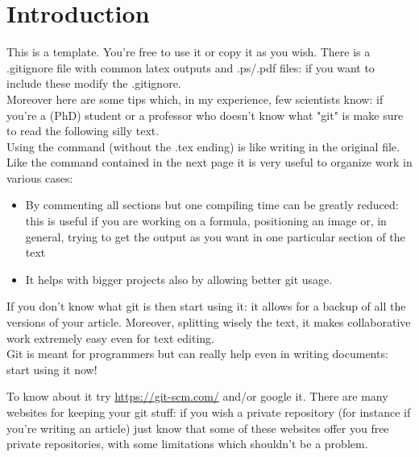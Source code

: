 \section{Introduction}

This is a template. You're free to use it or copy it as you wish.
There is a .gitignore file with common latex outputs and .ps/.pdf files:
if you want to include these modify the .gitignore.\\

Moreover here are some tips which, in my experience, few scientists know:
if you're a (PhD) student or a professor who doesn't know what "git" is 
make sure to read the following silly text.\\

Using the command \verb== (without the .tex ending) is
like writing in the original file.\\

Like the command contained in the next page it is very useful to organize
work in various cases:
\begin{itemize}
\item By commenting all sections but one compiling time can be greatly
reduced: this is useful if you are working on a formula, positioning an image
or, in general, trying to get the output as you want in one particular 
section of the text
\item It helps with bigger projects also by allowing better git usage.
\end{itemize}

If you don't know what git is then start using it: it allows for a backup
of all the versions of your article. Moreover, splitting wisely the text,
it makes collaborative work extremely easy even for text editing.\\

Git is meant for programmers but can really help even in writing documents:
start using it now!

To know about it try \url{https://git-scm.com/} and/or google it.
There are many websites for keeping your git stuff: if you wish a private
repository (for instance if you're writing an article) just know that some
of these websites offer you free private repositories, with some limitations
which shouldn't be a problem.
